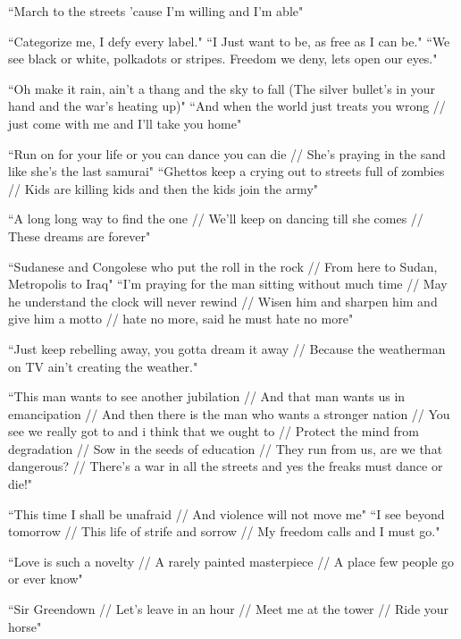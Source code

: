 \documentclass[11pt]{amsart}
\begin{document}
``March to the streets 'cause I'm willing and I'm able"\cite{queen}

``Categorize me, I defy every label."\cite{queen}
``I Just want to be, as free as I can be."\cite{polkadottedstripes}
``We see black or white, polkadots or stripes. Freedom we deny, lets open our eyes."\cite{polkadottedstripes}

``Oh make it rain, ain't a thang and the sky to fall (The silver bullet's in your hand and the war's heating up)" \cite{manymoons}
``And when the world just treats you wrong // just come with me and I'll take you home" \cite{manymoons}

``Run on for your life or you can dance you can die // She's praying in the sand like she's the last samurai"\cite{danceordie}
``Ghettos keep a crying out to streets full of zombies // Kids are killing kids and then the kids join the army"\cite{danceordie}

``A long long way to find the one // We'll keep on dancing till she comes // These dreams are forever"\cite{danceordie}

``Sudanese and Congolese who put the roll in the rock // From here to Sudan, Metropolis to Iraq"\cite{danceordie}
``I'm praying for the man sitting without much time // May he understand the clock will never rewind // Wisen him and sharpen him and give him a motto // hate no more, said he must hate no more"\cite{danceordie}

``Just keep rebelling away, you gotta dream it away // Because the weatherman on TV ain't creating the weather."\cite{danceordie}


``This man wants to see another jubilation //
And that man wants us in emancipation //
And then there is the man who wants a stronger nation //
You see we really got to and i think that we ought to //
Protect the mind from degradation //
Sow in the seeds of education //
They run from us, are we that dangerous? //
There's a war in all the streets and yes the freaks must dance or die!"\cite{danceordie}

``This time I shall be unafraid // And violence will not move me"\cite{babopbyeya}
``I see beyond tomorrow // This life of strife and sorrow // My freedom calls and I must go."\cite{babopbyeya}

``Love is such a novelty // A rarely painted masterpiece // A place few people go or ever know"\cite{sayyouwillgo}

``Sir Greendown // Let's leave in an hour // Meet me at the tower // Ride your horse"\cite{greendown}

{}

\end{document}
